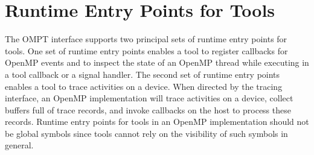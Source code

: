 %
%
%
%
%
%
%
%
%
%
%
%
%


\section{Runtime Entry Points for Tools}
\label{sec:entry-points}

The OMPT interface supports two principal sets of runtime entry points for tools. One
set of runtime entry points enables a tool to register callbacks for OpenMP
events and to inspect the state of an OpenMP thread while
executing in a tool callback or a signal handler. The second set of runtime entry points enables a
tool to trace activities on a device. When directed by the tracing
interface, an OpenMP implementation will trace activities on a device, collect
buffers full of trace records, and invoke callbacks on the host to
process these records. 
Runtime entry points for tools in an OpenMP implementation
should not be global symbols since tools cannot rely on the visibility
of such symbols in general.

